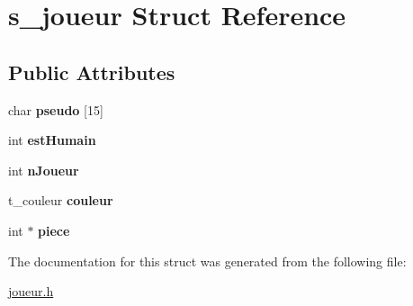 \hypertarget{structs__joueur}{}\section{s\+\_\+joueur Struct Reference}
\label{structs__joueur}
\subsection*{Public Attributes}
\begin{DoxyCompactItemize}
\item 
char {\bfseries pseudo} \mbox{[}15\mbox{]}\hypertarget{structs__joueur_a48ccb56720a4acbd3e43240469514bbe}{}\label{structs__joueur_a48ccb56720a4acbd3e43240469514bbe}

\item 
int {\bfseries est\+Humain}\hypertarget{structs__joueur_aa58c2ef96933809a9851604379ce7760}{}\label{structs__joueur_aa58c2ef96933809a9851604379ce7760}

\item 
int {\bfseries n\+Joueur}\hypertarget{structs__joueur_a700b69362c0084e8c2e7f41a459b5d44}{}\label{structs__joueur_a700b69362c0084e8c2e7f41a459b5d44}

\item 
t\+\_\+couleur {\bfseries couleur}\hypertarget{structs__joueur_a82bbd904732dc6a4be40a1a29dac4983}{}\label{structs__joueur_a82bbd904732dc6a4be40a1a29dac4983}

\item 
int $\ast$ {\bfseries piece}\hypertarget{structs__joueur_a3cd83582f34f83b03ca207b931d59cc1}{}\label{structs__joueur_a3cd83582f34f83b03ca207b931d59cc1}

\end{DoxyCompactItemize}


The documentation for this struct was generated from the following file\+:\begin{DoxyCompactItemize}
\item 
\hyperlink{joueur_8h}{joueur.\+h}\end{DoxyCompactItemize}
